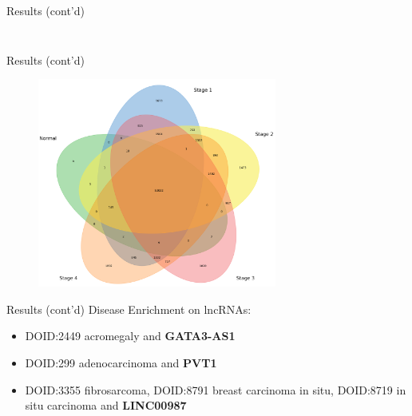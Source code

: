 \documentclass{beamer}
\begin{document}
\begin{frame}{Results (cont'd)}
\begin{columns}
\begin{column}{.48\textwidth}
\begin{figure}[ht]
				\caption*{\label{fig:data-aug}}
			\end{figure}
		\end{column}
	\end{columns}
\end{frame}
\begin{frame}{Results (cont'd)}
	\begin{figure}[ht]
		\centering
		\includegraphics[width=0.7\textwidth,keepaspectratio]{figures/network-venn.png}
		\caption*{\label{fig:network-venn}}
	\end{figure}
\end{frame}
\begin{frame}{Results (cont'd)}
	Disease Enrichment on lncRNAs:
	\begin{itemize}
		\item DOID:2449 acromegaly and \textbf{GATA3-AS1}
		\item DOID:299 adenocarcinoma and \textbf{PVT1}
		\item DOID:3355 fibrosarcoma, DOID:8791 breast carcinoma in situ, DOID:8719 in situ carcinoma and \textbf{LINC00987}
	\end{itemize}
\end{frame}
\end{document}
